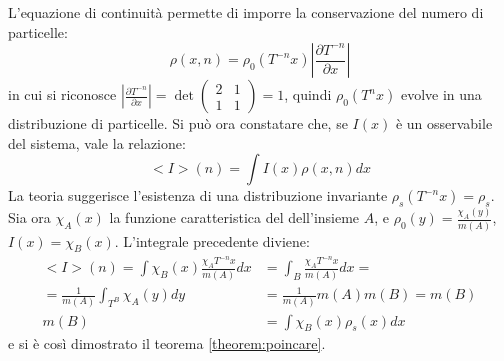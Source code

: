 \documentclass[12pt, a4paper]{book}
\theoremstyle{theorem}
\begin{document}
				L'equazione di continuità permette di imporre la conservazione del numero di particelle:
				\begin{equation*}
					\rho(x,n)=\rho_{0}\left(T^{-n}x\right)\left\lvert\frac{\partial T^{-n}}{\partial x}\right\rvert 
				\end{equation*}
				in cui si riconosce $\left\lvert\frac{\partial T^{-n}}{\partial x}\right\rvert=
				\det
				\left(
					\begin{matrix}
						2 & 1\\
						1 & 1 
					\end{matrix}
				\right)=1$, quindi $\rho_{0}\left(T^{n}x\right)$ evolve in una distribuzione di particelle.
				Si può ora constatare che, se $I(x)$ è un osservabile del sistema, vale la relazione:
				\begin{equation*}
					<I>(n)=\int I(x)\rho(x,n)dx
				\end{equation*}
				La teoria suggerisce l'esistenza di una distribuzione invariante $\rho_{s}\left(T^{-n}x\right)=\rho_{s}$.
				Sia ora $\chi_{A}(x)$ la funzione caratteristica del dell'insieme $A$, e $\rho_{0}(y)=\frac{\chi_{A}(y)}{m(A)}$, $I(x)=\chi_{B}(x)$.
				L'integrale precedente diviene:
				\begin{equation}
					\begin{split}
						<I>(n)=\int\chi_{B}(x)\frac{\chi_{A}T^{-n}x}{m(A)}dx&=\int_{B}\frac{\chi_{A}T^{-n}x}{m(A)}dx=\\
						=\frac{1}{m(A)}\int_{T^{B}}\chi_{A}(y)dy&=\frac{1}{m(A)}m(A)m(B)=m(B)\\
						m(B)&=\int\chi_{B}(x)\rho_{s}(x)dx
					\end{split}
				\end{equation}
				e si è così dimostrato il teorema \ref{theorem:poincare}.
\end{document}
